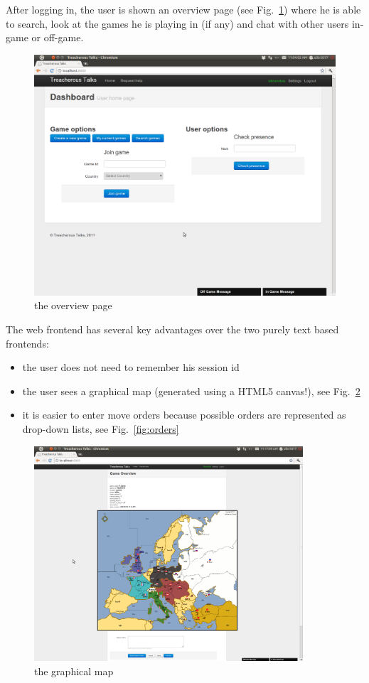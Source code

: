 \documentclass[11pt,a4paper]{report}
\begin{document}
After logging in, the user is shown an overview page (see Fig.~\ref{fig:overview})
 where he is able to search, look at the games he is playing in (if any) and chat
with other users in-game or off-game.

\begin{figure}[h]
 \centering
 \includegraphics[width=\textwidth]{./graphics/overviewpage.png}
 \caption{the overview page}
 \label{fig:overview}
\end{figure}

The web frontend has several key advantages over the two purely text based
frontends:\\
\begin{itemize}
\item the user does not need to remember his session id
\item the user sees a graphical map (generated using a HTML5 canvas!),
  see Fig.~\ref{fig:map}
\item it is easier to enter move orders because possible orders are represented
  as drop-down lists, see Fig.~\ref{fig:orders}
\end{itemize}

\begin{figure}[h]
 \centering
 \includegraphics[width=10cm]{./graphics/graphicalmap.png}
 \caption{the graphical map}
 \label{fig:map}
\end{figure}
\end{document}
